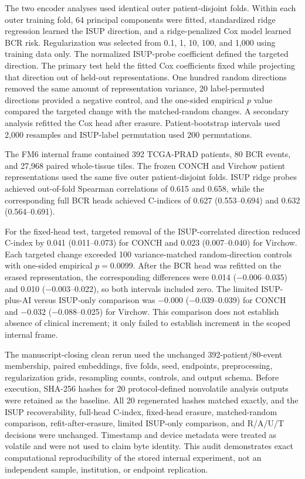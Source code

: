 The two encoder analyses used identical outer patient-disjoint folds. Within each outer
training fold, 64 principal components were fitted, standardized ridge regression learned
the ISUP direction, and a ridge-penalized Cox model learned BCR risk. Regularization was
selected from 0.1, 1, 10, 100, and 1,000 using training data only. The normalized ISUP-probe
coefficient defined the targeted direction. The primary test held the fitted Cox coefficients
fixed while projecting that direction out of held-out representations. One hundred random
directions removed the same amount of representation variance, 20 label-permuted directions
provided a negative control, and the one-sided empirical $p$ value compared the targeted
change with the matched-random changes. A secondary analysis refitted the Cox head after
erasure. Patient-bootstrap intervals used 2,000 resamples and ISUP-label permutation used
200 permutations.

The FM6 internal frame contained 392 TCGA-PRAD patients, 80 BCR events, and 27,968 paired
whole-tissue tiles. The frozen CONCH and Virchow patient representations used the same five
outer patient-disjoint folds. ISUP ridge probes achieved out-of-fold Spearman correlations
of 0.615 and 0.658, while the corresponding full BCR heads achieved C-indices of 0.627
(0.553--0.694) and 0.632 (0.564--0.691).

For the fixed-head test, targeted removal of the ISUP-correlated direction reduced C-index
by 0.041 (0.011--0.073) for CONCH and 0.023 (0.007--0.040) for Virchow. Each targeted change
exceeded 100 variance-matched random-direction controls with one-sided empirical
$p=0.0099$. After the BCR head was refitted on the erased representation, the corresponding
differences were 0.014 ($-0.006$--0.035) and 0.010 ($-0.003$--0.022), so both intervals
included zero. The limited ISUP-plus-AI versus ISUP-only comparison was $-0.000$
($-0.039$--0.039) for CONCH and $-0.032$ ($-0.088$--0.025) for Virchow. This comparison
does not establish absence of clinical increment; it only failed to establish increment in
the scoped internal frame.

The manuscript-closing clean rerun used the unchanged 392-patient/80-event membership,
paired embeddings, five folds, seed, endpoints, preprocessing, regularization grids,
resampling counts, controls, and output schema. Before execution, SHA-256 hashes for 20
protocol-defined nonvolatile analysis outputs were retained as the baseline. All 20
regenerated hashes matched exactly, and the ISUP recoverability, full-head C-index,
fixed-head erasure, matched-random comparison, refit-after-erasure, limited ISUP-only
comparison, and R/A/U/T decisions were unchanged. Timestamp and device metadata were
treated as volatile and were not used to claim byte identity. This audit demonstrates exact
computational reproducibility of the stored internal experiment, not an independent sample,
institution, or endpoint replication.


